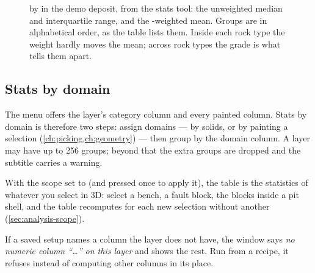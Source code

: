 \begin{figure}[htbp]\centering
{}
\caption{ by  in the demo deposit, from the stats tool: the unweighted median and interquartile range, and the -weighted mean. Groups are in alphabetical order, as the table lists them. Inside each rock type the weight hardly moves the mean; across rock types the grade is what tells them apart.}\label{fig:stats-demo}
\end{figure}

\subsection{Stats by domain}
The  menu offers the layer's category column and every painted column. Stats by domain is therefore two steps: assign domains — by solids, or by painting a selection (\cref{ch:picking,ch:geometry}) — then group by the domain column. A layer may have up to 256 groups; beyond that the extra groups are dropped and the subtitle carries a warning.

With the scope set to  (and  pressed once to apply it), the table is the statistics of whatever you select in 3D: select a bench, a fault block, the blocks inside a pit shell, and the table recomputes for each new selection without another  (\cref{sec:analysis-scope}).

If a saved setup names a column the layer does not have, the window says \emph{no numeric column “…” on this layer} and shows the rest. Run from a recipe, it refuses instead of computing other columns in its place.

